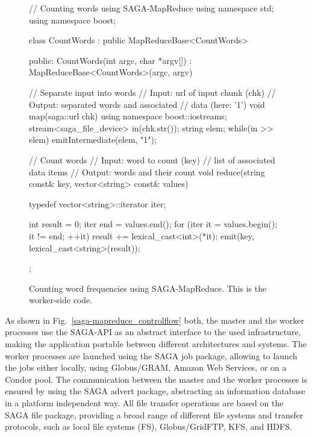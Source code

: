 \documentclass[conference,final]{IEEEtran}
\begin{document}
\begin{figure}[!ht]
 \begin{center}
  \begin{mycode}[label=SAGA MapReduce Word Count Algorithm]
  // Counting words using SAGA-MapReduce
  using namespace std;
  using namespace boost;

  class CountWords 
    : public MapReduceBase<CountWords> {
  public:
    CountWords(int argc, char *argv[]) 
      : MapReduceBase<CountWords>(argc, argv) 
    {}

    // Separate input into words
    // Input:  url of input chunk (chk)
    // Output: separated words and associated 
    //         data (here: '1')
    void map(saga::url chk) {
      using namespace boost::iostreams;
      stream<saga_file_device> in(chk.str());
      string elem;
      while(in >> elem) 
        emitIntermediate(elem, "1");
    } 

    // Count words
    // Input:  word to count (key)
    //         list of associated data items
    // Output: words and their count
    void reduce(string const& key, 
      vector<string> const& values) {
      typedef vector<string>::iterator iter;

      int result = 0;
      iter end = values.end();
      for (iter it = values.begin(); 
           it != end; ++it) {
        result += lexical_cast<int>(*it);
      }
      emit(key, lexical_cast<string>(result));
    }
  };
  \end{mycode}
  \caption{\label{src:saga-mapreduce} Counting word frequencies using
    SAGA-MapReduce. This is the worker-side code.}
 \end{center}
\end{figure}

As shown in Fig.~\ref{saga-mapreduce_controlflow} both, the master and
the worker processes use the SAGA-API as an abstract interface to the
used infrastructure, making the application portable between different
architectures and systems. The worker processes are launched using the
SAGA job package, allowing to launch the jobs either locally, using
Globus/GRAM, Amazon Web Services, or on a Condor pool. The
communication between the master and the worker processes is ensured
by using the SAGA advert package, abstracting an information database
in a platform independent way. All file transfer operations are based
on the SAGA file package, providing a broad range of different file
systems and transfer protocols, such as local file systems (FS),
Globus/GridFTP, KFS, and HDFS.
\end{document}
